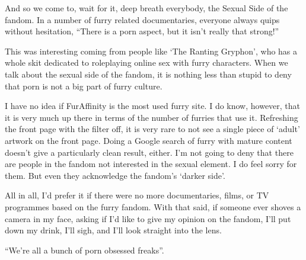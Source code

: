 And so we come to, wait for it, deep breath everybody, the Sexual Side of the fandom. In a number of furry related documentaries, everyone always quips without hesitation, ``There is a porn aspect, but it isn't really that strong!''

This was interesting coming from people like `The Ranting Gryphon', who has a whole skit dedicated to roleplaying online sex with furry characters. When we talk about the sexual side of the fandom, it is nothing less than stupid to deny that porn is not a big part of furry culture.

I have no idea if FurAffinity is the most used furry site. I do know, however, that it is very much up there in terms of the number of furries that use it. Refreshing the front page with the filter off, it is very rare to not see a single piece of `adult' artwork on the front page. Doing a Google search of furry with mature content doesn't give a particularly clean result, either. I'm not going to deny that there are people in the fandom not interested in the sexual element. I do feel sorry for them. But even they acknowledge the fandom's `darker side'.

All in all, I'd prefer it if there were no more documentaries, films, or TV programmes based on the furry fandom. With that said, if someone ever shoves a camera in my face, asking if I'd like to give my opinion on the fandom, I'll put down my drink, I'll sigh, and I'll look straight into the lens.

``We're all a bunch of porn obsessed freaks''.
